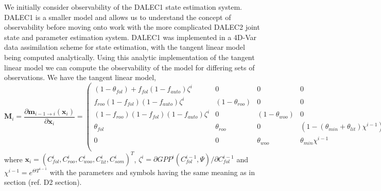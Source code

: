 \documentclass[11pt]{article}
\begin{document}
We initially consider observability of the DALEC1 state estimation system. DALEC1 is a smaller model and allows us to understand the concept of observability before moving onto work with the more complicated DALEC2 joint state and parameter estimation system. DALEC1 was implemented in a 4D-Var data assimilation scheme for state estimation, with the tangent linear model being computed analytically. Using this analytic implementation of the tangent linear model we can compute the observability of the model for differing sets of observations. We have the tangent linear model,
\begin{dmath}
\mathbf{M}_{i} = \frac{\partial \textbf{m}_{i-1\rightarrow i}(\textbf{x}_{i})}{\partial \textbf{x}_{i}} = 
\begin{pmatrix}  
(1-\theta_{fol})+f_{fol}(1-f_{auto})\zeta^i & 0 & 0 & 0 & 0 \\
f_{roo}(1-f_{fol})(1-f_{auto})\zeta^i & (1-\theta_{roo}) & 0 & 0 & 0 \\
(1-f_{roo})(1-f_{fol})(1-f_{auto})\zeta^i & 0 & (1-\theta_{woo}) & 0 & 0 \\
\theta_{fol} & \theta_{roo} & 0 & (1-(\theta_{min}+\theta_{lit})\chi^{i-1}) & 0 \\
0 & 0 & \theta_{woo} & \theta_{min}\chi^{i-1} & (1-\theta_{som}\chi^{i-1}) \\
\end{pmatrix}, \label{eqn:linmod}
\end{dmath}
where \(\textbf{x}_{i}=(C_{fol}^{i}, C_{roo}^{i}, C_{woo}^{i}, C_{lit}^{i}, C_{som}^{i})^{T}\), \(\zeta^i = \partial GPP^{i}(C_{fol}^{i-1}, \Psi)/\partial C_{fol}^{i-1}\) and \(\chi^{i-1}=e^{\Theta T^{i-1}}\) with the parameters and symbols having the same meaning as in section ({\color{red}ref. D2 section}). 
\end{document}
